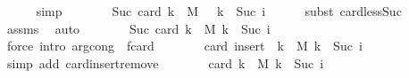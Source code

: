 \begin{isabellebody}
\ \ \ \ \isamarkupfalse%
\ simp\isanewline
\ \ \isamarkupfalse%
\ \isamarkupfalse%
\ {\isachardoublequoteopen}{\isasymdots}\ {\isacharequal}{\kern0pt}\ Suc\ {\isacharparenleft}{\kern0pt}card\ {\isacharbraceleft}{\kern0pt}k\ {\isasymin}\ M\ {\isacharminus}{\kern0pt}\ {\isacharbraceleft}{\kern0pt}{}{\isacharbraceright}{\kern0pt}{\isachardot}{\kern0pt}\ k\ {\isacharless}{\kern0pt}\ Suc\ i{\isacharbraceright}{\kern0pt}{\isacharparenright}{\kern0pt}{\isachardoublequoteclose}\isanewline
\ \ \ \ \isamarkupfalse%
\ {\isacharparenleft}{\kern0pt}subst\ card{\isacharunderscore}{\kern0pt}less{\isacharunderscore}{\kern0pt}Suc{}{\isacharparenright}{\kern0pt}\isanewline
\ \ \ \ \isamarkupfalse%
\ assms\ \isamarkupfalse%
\ auto\isanewline
\ \ \isamarkupfalse%
\ \isamarkupfalse%
\ {\isachardoublequoteopen}{\isasymdots}\ {\isacharequal}{\kern0pt}\ Suc\ {\isacharparenleft}{\kern0pt}card\ {\isacharparenleft}{\kern0pt}{\isacharbraceleft}{\kern0pt}k\ {\isasymin}\ M{\isachardot}{\kern0pt}\ k\ {\isacharless}{\kern0pt}\ Suc\ i{\isacharbraceright}{\kern0pt}\ {\isacharminus}{\kern0pt}\ {\isacharbraceleft}{\kern0pt}{}{\isacharbraceright}{\kern0pt}{\isacharparenright}{\kern0pt}{\isacharparenright}{\kern0pt}{\isachardoublequoteclose}\isanewline
\ \ \ \ \isamarkupfalse%
\ {\isacharparenleft}{\kern0pt}force\ intro{\isacharcolon}{\kern0pt}\ arg{\isacharunderscore}{\kern0pt}cong\ {\isacharbrackleft}{\kern0pt}\ f{\isacharequal}{\kern0pt}card{\isacharbrackright}{\kern0pt}{\isacharparenright}{\kern0pt}\isanewline
\ \ \isamarkupfalse%
\ \isamarkupfalse%
\ {\isachardoublequoteopen}{\isasymdots}\ {\isacharequal}{\kern0pt}\ card\ {\isacharparenleft}{\kern0pt}insert\ {}\ {\isacharparenleft}{\kern0pt}{\isacharbraceleft}{\kern0pt}k\ {\isasymin}\ M{\isachardot}{\kern0pt}\ k\ {\isacharless}{\kern0pt}\ Suc\ i{\isacharbraceright}{\kern0pt}\ {\isacharminus}{\kern0pt}\ {\isacharbraceleft}{\kern0pt}{}{\isacharbraceright}{\kern0pt}{\isacharparenright}{\kern0pt}{\isacharparenright}{\kern0pt}{\isachardoublequoteclose}\isanewline
\ \ \ \ \isamarkupfalse%
\ {\isacharparenleft}{\kern0pt}simp\ add{\isacharcolon}{\kern0pt}\ card{\isachardot}{\kern0pt}insert{\isacharunderscore}{\kern0pt}remove{\isacharparenright}{\kern0pt}\isanewline
\ \ \isamarkupfalse%
\ \isamarkupfalse%
\ {\isachardoublequoteopen}{\isachardot}{\kern0pt}{\isachardot}{\kern0pt}{\isachardot}{\kern0pt}\ {\isacharequal}{\kern0pt}\ card\ {\isacharbraceleft}{\kern0pt}k\ {\isasymin}\ M{\isachardot}{\kern0pt}\ k\ {\isacharless}{\kern0pt}\ Suc\ i{\isacharbraceright}{\kern0pt}{\isachardoublequoteclose}\isanewline

\end{isabellebody}
